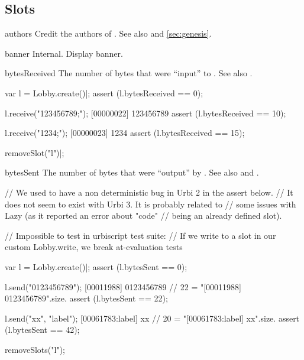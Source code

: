 \subsection{Slots}
\begin{urbiscriptapi}
\item[authors] Credit the authors of \usdk.  See also  and
  \autoref{sec:genesis}.

\item[banner] Internal.  Display \usdk banner.

\item[bytesReceived] The number of bytes that were ``input'' to \this.  See
  also .
\begin{urbiscript}
var l = Lobby.create()|;
assert (l.bytesReceived == 0);

l.receive("123456789;");
[00000022] 123456789
assert (l.bytesReceived == 10);

l.receive("1234;");
[00000023] 1234
assert (l.bytesReceived == 15);
\end{urbiscript}
\begin{urbicomment}
removeSlot("l")|;
\end{urbicomment}


\item[bytesSent] The number of bytes that were ``output'' by \this.  See
  also  and .
\begin{urbicomment}
// We used to have a non deterministic bug in Urbi 2 in the assert below.
// It does not seem to exist with Urbi 3.  It is probably related to
// some issues with Lazy (as it reported an error about "code"
// being an already defined slot).

// Impossible to test in urbiscript test suite:
// If we write to a slot in our custom Lobby.write, we break at-evaluation tests
\end{urbicomment}
\begin{urbiunchecked}
var l = Lobby.create()|;
assert (l.bytesSent == 0);

l.send("0123456789");
[00011988] 0123456789
// 22 = "[00011988] 0123456789\n".size.
assert (l.bytesSent == 22);

l.send("xx", "label");
[00061783:label] xx
// 20 = "[00061783:label] xx\n".size.
assert (l.bytesSent == 42);

\end{urbiunchecked}
\begin{urbicomment}
removeSlots("l");
\end{urbicomment}



\end{urbiscriptapi}
